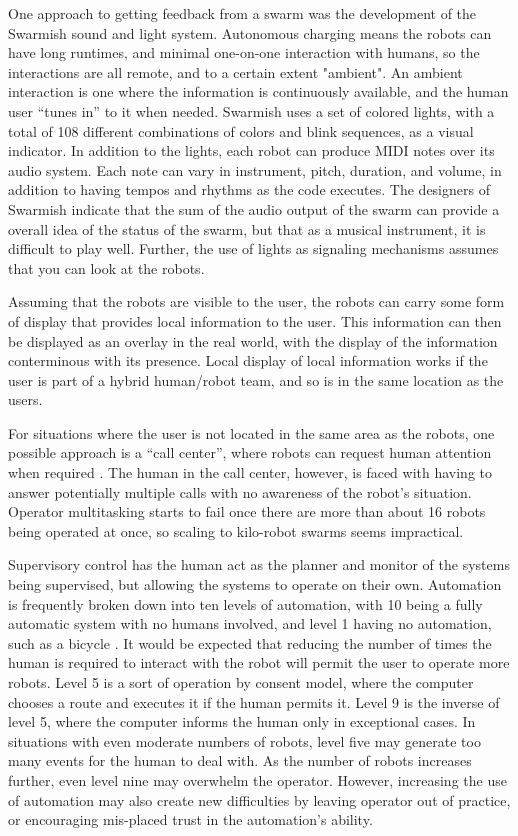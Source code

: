 \documentclass[]{article}
\begin{document}
One approach to getting feedback from a swarm was the development of the Swarmish sound and light system\cite{mclurkin2006speaking}. 
Autonomous charging means the robots can have long runtimes, and minimal one-on-one interaction with humans, so the interactions are all remote, and to a certain extent "ambient". 
An ambient interaction is one where the information is continuously available, and the human user ``tunes in'' to it when needed. Swarmish uses a set of colored lights, with a total of 108 different combinations of colors and blink sequences, as a visual indicator. 
In addition to the lights, each robot can produce MIDI notes over its audio system. 
Each note can vary in instrument, pitch, duration, and volume, in addition to having tempos and rhythms as the code executes. 
The designers of Swarmish indicate that the sum of the audio output of the swarm can provide a overall idea of the status of the swarm, but that as a musical instrument, it is difficult to play well. 
Further, the use of lights as signaling mechanisms assumes that you can look at the robots. 

Assuming that the robots are visible to the user, the robots can carry some form of display that provides local information to the user. 
This information can then be displayed as an overlay in the real world, with the display of the information conterminous with its presence\cite{Daily:2003:WEI:820752.821587}. 
Local display of local information works if the user is part of a hybrid human/robot team, and so is in the same location as the users. 

For situations where the user is not located in the same area as the robots, one possible approach is a ``call center'', where robots can request human attention when required \cite{chen2011supervisory}. The human in the call center, however, is faced with having to answer potentially multiple calls with no awareness of the robot's situation. Operator multitasking starts to fail once there are more than about 16 robots being operated at once, so scaling to kilo-robot swarms seems impractical.  

Supervisory control has the human act as the planner and monitor of the systems being supervised, but allowing the systems to operate on their own.
Automation is frequently broken down into ten levels of automation, with 10 being a fully automatic system with no humans involved, and level 1 having no automation, such as a bicycle \cite{parasuraman2000model}. 
It would be expected that reducing the number of times the human is required to interact with the robot will permit the user to operate more robots. 
Level 5 is a sort of operation by consent model, where the computer chooses a route and executes it if the human permits it. 
Level 9 is the inverse of level 5, where the computer informs the human only in exceptional cases. 
In situations with even moderate numbers of robots, level five may generate too many events for the human to deal with. 
As the number of robots increases further, even level nine may overwhelm the operator. 
However, increasing the use of automation may also create new difficulties by leaving operator out of practice, or encouraging mis-placed trust in the automation's ability. 
\end{document}
